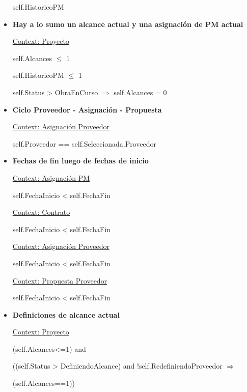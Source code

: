 \begin{itemize}
			self.HistoricoPM
	
	\item \textbf{Hay a lo sumo un alcance actual y una asignación de PM actual}
	
			\underline{Context: Proyecto}
			
			self.Alcances $\leq$ 1
			
			self.HistoricoPM $\leq$ 1
			
			self.Status > ObraEnCurso $\Rightarrow$ self.Alcances = 0
			
	\item \textbf{Ciclo Proveedor - Asignaci\'on - Propuesta}
	
			\underline{Context: Asignación Proveedor}
			
			self.Proveedor == self.Seleccionada.Proveedor
	
	\item \textbf{Fechas de fin luego de fechas de inicio}
			
			\underline{Context: Asignación PM}
			
			self.FechaInicio < self.FechaFin
			
			\underline{Context: Contrato}
			
			self.FechaInicio < self.FechaFin
			
			\underline{Context: Asignación Proveedor}
			
			self.FechaInicio < self.FechaFin
			
			\underline{Context: Propuesta Proveedor}
			
			self.FechaInicio < self.FechaFin			
	
	\item \textbf{Definiciones de alcance actual}
	
			\underline{Context: Proyecto}
			
			(self.Alcances<=1) and
			
			((self.Status > DefiniendoAlcance) and !self.RedefiniendoProveedor $\Rightarrow$
			
			(self.Alcances==1))
			
	
\end{itemize}
